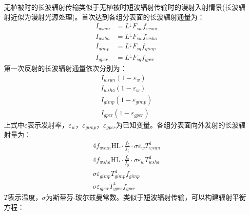 无植被时的长波辐射传输类似于无植被时短波辐射传输时的漫射入射情景(长波辐射近似为漫射光源处理)。首次达到各组分表面的长波辐射通量为：
\begin{equation}
\begin{aligned} I_{wsun} &=L ^\downarrow F_{s w} f_{wsun} \\ I_{wsha} &=L^\downarrow F_{s w} f_{wsha} \\ I_{gimp} &=L^\downarrow F_{s g} f_{gimp} \\ I_{gper} &=L^\downarrow F_{s g} f_{gper} \end{aligned}
\end{equation}
第一次反射的长波辐射通量依次分别为：
\begin{equation}
\begin{array}{c}I_{wsun}\left(1-\varepsilon_{w}\right) \\ I_{wsha}\left(1-\varepsilon_{w}\right) \\ I_{gimp}\left(1-\varepsilon_{gimp}\right) \\ I_{gper}\left(1-\varepsilon_{gper}\right)\end{array}
\end{equation}
上式中$\varepsilon$表示发射率，$\varepsilon_w$，$\varepsilon_{gimp}$，$\varepsilon_{gper}$为已知变量。各组分表面向外发射的长波辐射量为：
\begin{equation}
\begin{array}{c}4 f_{wsun} \mathrm{HL} \cdot \frac{f_{b}}{f_{g}} \cdot \sigma \varepsilon_{w} T_{wsun}^{4} \\
4 f_{wsha} \mathrm{HL} \cdot \frac{f_{b}}{f_{g}} \cdot \sigma \varepsilon_{w} T_{wsha}^{4} \\
\sigma \varepsilon_{gimp} T_{gimp}^{4} f_{gimp} \\
\sigma \varepsilon_{gper} T_{gper}^{4} f_{gper}\end{array}
\end{equation}
$T$表示温度，$\sigma$为斯蒂芬-玻尔兹曼常数。类似于短波辐射传输，可以构建辐射平衡方程：

